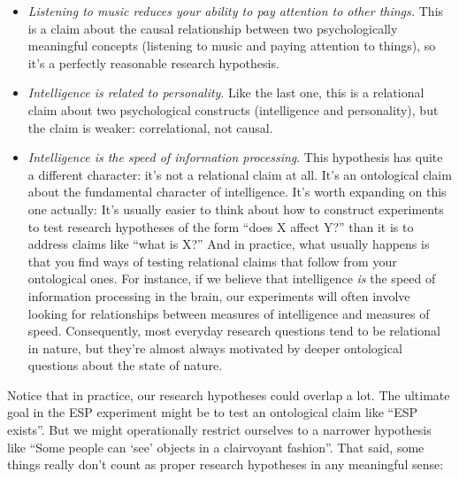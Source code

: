 \documentclass[
  11pt,
  a4paper,
  twoside,symmetric,openright]{book}
\providecommand{\tightlist}{%
  \setlength{\itemsep}{0pt}\setlength{\parskip}{0pt}}
\theoremstyle{break}
\theoremstyle{break}
\begin{document}
\begin{itemize}
\tightlist
\item
  \emph{Listening to music reduces your ability to pay attention to other things.} This is a claim about the causal relationship between two psychologically meaningful concepts (listening to music and paying attention to things), so it's a perfectly reasonable research hypothesis.
\item
  \emph{Intelligence is related to personality}. Like the last one, this is a relational claim about two psychological constructs (intelligence and personality), but the claim is weaker: correlational, not causal.
\item
  \emph{Intelligence is the speed of information processing}. This hypothesis has quite a different character: it's not a relational claim at all. It's an ontological claim about the fundamental character of intelligence. It's worth expanding on this one actually: It's usually easier to think about how to construct experiments to test research hypotheses of the form ``does X affect Y?'' than it is to address claims like ``what is X?'' And in practice, what usually happens is that you find ways of testing relational claims that follow from your ontological ones. For instance, if we believe that intelligence \emph{is} the speed of information processing in the brain, our experiments will often involve looking for relationships between measures of intelligence and measures of speed. Consequently, most everyday research questions tend to be relational in nature, but they're almost always motivated by deeper ontological questions about the state of nature.
\end{itemize}

Notice that in practice, our research hypotheses could overlap a lot. The ultimate goal in the ESP experiment might be to test an ontological claim like ``ESP exists''. But we might operationally restrict ourselves to a narrower hypothesis like ``Some people can `see' objects in a clairvoyant fashion''. That said, some things really don't count as proper research hypotheses in any meaningful sense:
\end{document}
